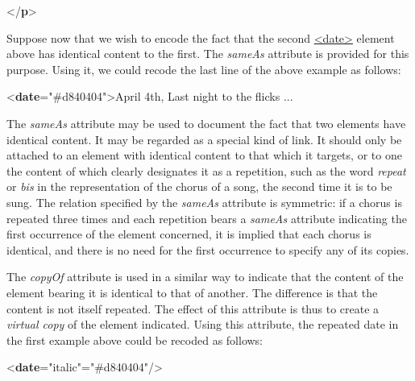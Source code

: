 \begin{shaded}
{</\textbf{p}>}\end{shaded}\egroup\par \noindent  Suppose now that we wish to encode the fact that the second \hyperref[TEI.date]{<date>} element above has identical content to the first. The {\itshape sameAs} attribute is provided for this purpose. Using it, we could recode the last line of the above example as follows: \par\bgroup{}\exampleFont \begin{shaded}\noindent\mbox{}{<\textbf{date}\hspace*{1em}{sameAs}="{\#d840404}">}April 4th,\mbox{}\mbox{}\newline 
 Last night to the flicks ... \end{shaded}\egroup\par \par
The {\itshape sameAs} attribute may be used to document the fact that two elements have identical content. It may be regarded as a special kind of link. It should only be attached to an element with identical content to that which it targets, or to one the content of which clearly designates it as a repetition, such as the word \textit{repeat} or \textit{bis} in the representation of the chorus of a song, the second time it is to be sung. The relation specified by the {\itshape sameAs} attribute is symmetric: if a chorus is repeated three times and each repetition bears a {\itshape sameAs} attribute indicating the first occurrence of the element concerned, it is implied that each chorus is identical, and there is no need for the first occurrence to specify any of its copies.\par
The {\itshape copyOf} attribute is used in a similar way to indicate that the content of the element bearing it is identical to that of another. The difference is that the content is not itself repeated. The effect of this attribute is thus to create a \textit{virtual copy} of the element indicated. Using this attribute, the repeated date in the first example above could be recoded as follows: \par\bgroup{}\exampleFont \begin{shaded}\noindent\mbox{}{<\textbf{date}\hspace*{1em}{rend}="{italic}"\hspace*{1em}{copyOf}="{\#d840404}"/>}\end{shaded}\egroup\par \par
